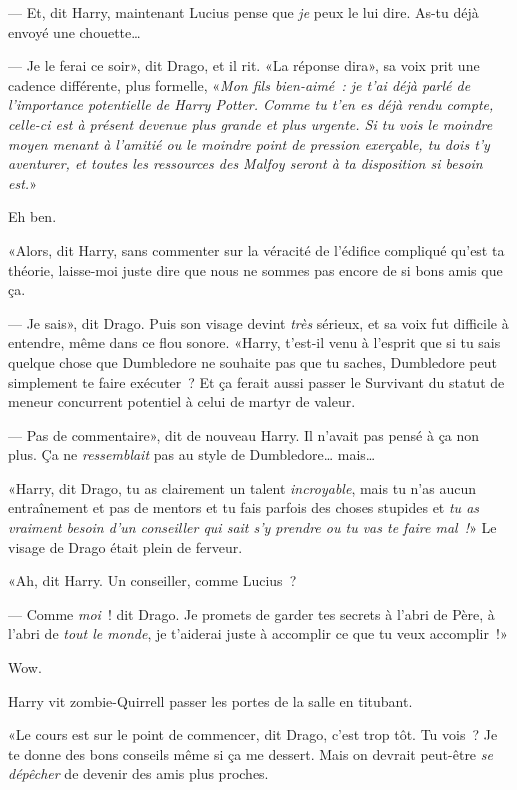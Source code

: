 --- Et, dit Harry, maintenant Lucius pense que \emph{je} peux le lui dire. As-tu déjà envoyé une chouette…

--- Je le ferai ce soir», dit Drago, et il rit. «La réponse dira», sa voix prit une cadence différente, plus formelle, «\emph{Mon fils bien-aimé~: je t'ai déjà parlé de l'importance potentielle de Harry Potter. Comme tu t'en es déjà rendu compte, celle-ci est à présent devenue plus grande et plus urgente. Si tu vois le moindre moyen menant à l'amitié ou le moindre point de pression exerçable, tu dois t'y aventurer, et toutes les ressources des Malfoy seront à ta disposition si besoin est.}»

Eh ben.

«Alors, dit Harry, sans commenter sur la véracité de l'édifice compliqué qu'est ta théorie, laisse-moi juste dire que nous ne sommes pas encore de si bons amis que ça.

--- Je sais», dit Drago. Puis son visage devint \emph{très} sérieux, et sa voix fut difficile à entendre, même dans ce flou sonore. «Harry, t'est-il venu à l'esprit que si tu sais quelque chose que Dumbledore ne souhaite pas que tu saches, Dumbledore peut simplement te faire exécuter~? Et ça ferait aussi passer le Survivant du statut de meneur concurrent potentiel à celui de martyr de valeur.

--- Pas de commentaire», dit de nouveau Harry. Il n'avait pas pensé à ça non plus. Ça ne \emph{ressemblait} pas au style de Dumbledore… mais…

«Harry, dit Drago, tu as clairement un talent \emph{incroyable}, mais tu n'as aucun entraînement et pas de mentors et tu fais parfois des choses stupides et \emph{tu as vraiment besoin d'un conseiller qui sait s'y prendre ou tu vas te faire mal~!}» Le visage de Drago était plein de ferveur.

«Ah, dit Harry. Un conseiller, comme Lucius~?

--- Comme \emph{moi}~! dit Drago. Je promets de garder tes secrets à l'abri de Père, à l'abri de \emph{tout le monde}, je t'aiderai juste à accomplir ce que tu veux accomplir~!»

Wow.

Harry vit zombie-Quirrell passer les portes de la salle en titubant.

«Le cours est sur le point de commencer, dit Drago, c'est trop tôt. Tu vois~? Je te donne des bons conseils même si ça me dessert. Mais on devrait peut-être \emph{se dépêcher} de devenir des amis plus proches.

